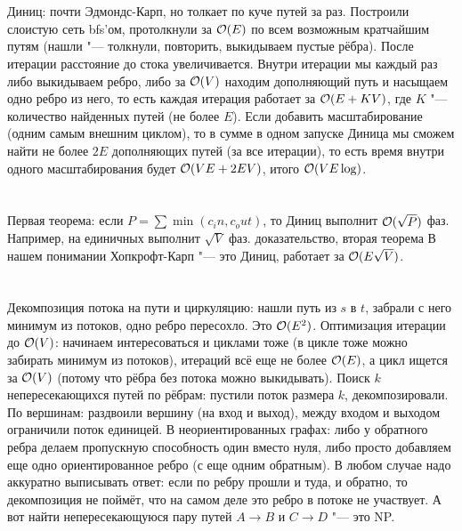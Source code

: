 \section{} %
Диниц: почти Эдмондс-Карп, но толкает по куче путей за раз.
Построили слоистую сеть bfs'ом, протолкнули за $\mathcal{O}(E)$ по всем возможным кратчайшим путям (нашли "--- толкнули, повторить, выкидываем пустые рёбра).
После итерации расстояние до стока увеличивается.
Внутри итерации мы каждый раз либо выкидываем ребро, либо за $\mathcal{O}(V)$ находим дополняющий путь и насыщаем одно ребро из него,
то есть каждая итерация работает за $\mathcal{O}(E+KV)$, где $K$ "--- количество найденных путей (не более $E$).
Если добавить масштабирование (одним самым внешним циклом), то в сумме в одном запуске Диница мы сможем найти не более $2E$ дополняющих путей (за все итерации), то есть время
внутри одного масштабирования будет $\mathcal{O}(VE+2EV)$, итого $\mathcal{O}(VE\log)$.

\section{} %
Первая теорема: если $P=\sum \min(c_in, c_out)$, то Диниц выполнит $\mathcal{O}(\sqrt P)$ фаз.
Например, на единичных выполнит $\sqrt V$ фаз.
\TODO доказательство, вторая теорема
В нашем понимании Хопкрофт-Карп "--- это Диниц, работает за $\mathcal{O}(E \sqrt V)$.

\section{} %
Декомпозиция потока на пути и циркуляцию: нашли путь из $s$ в $t$, забрали с него минимум из потоков, одно ребро пересохло.
Это $\mathcal{O}(E^2)$.
Оптимизация итерации до $\mathcal{O}(V)$: начинаем интересоваться и циклами тоже (в цикле тоже можно забирать минимум из потоков),
итераций всё еще не более $\mathcal{O}(E)$, а цикл ищется за $\mathcal{O}(V)$ (потому что рёбра без потока можно выкидывать).
Поиск $k$ непересекающихся путей по рёбрам: пустили поток размера $k$, декомпозировали.
По вершинам: раздвоили вершину (на вход и выход), между входом и выходом ограничили поток единицей.
В неориентированных графах: либо у обратного ребра делаем пропускную способность один вместо нуля, либо просто добавляем еще одно ориентированное ребро (с еще одним обратным).
В любом случае надо аккуратно выписывать ответ: если по ребру прошли и туда, и обратно, то декомпозиция не поймёт, что на самом деле это ребро в потоке не участвует.
А вот найти непересекающуюся пару путей $A\to B$ и $C \to D$ "--- это NP.

